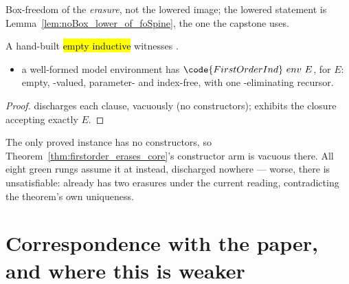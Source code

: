 \begin{remark}
 Box-freedom of the \emph{erasure}, not the lowered image; the lowered statement is
Lemma~\ref{lem:noBox_lower_of_foSpine}, the one the capstone uses.
\end{remark}

\begin{lemma}
\label{lem:FOModel-firstOrderInd_E}
\leanok
{}
 A hand-built \hl{empty inductive} witnesses .
\begin{itemize}
\item {} a well-formed model environment has $\code{FirstOrderInd}\ env\ E$, for $E$: empty,
-valued, parameter- and index-free, with one -eliminating recursor.
\end{itemize}
\end{lemma}
\begin{proof}
\leanok
{}
  discharges each clause, vacuously (no constructors);
 exhibits the closure accepting exactly $E$.
\end{proof}

\begin{remark}
 The only proved  instance has no constructors, so
Theorem~\ref{thm:firstorder_erases_core}'s constructor arm is vacuous there. All eight green rungs
assume it at  instead, discharged nowhere --- worse,  there is
unsatisfiable:  already has two erasures under the current 
reading, contradicting the theorem's own uniqueness.
\end{remark}

\section{Correspondence with the paper, and where this is weaker}
\label{sec:correctness:paper}

